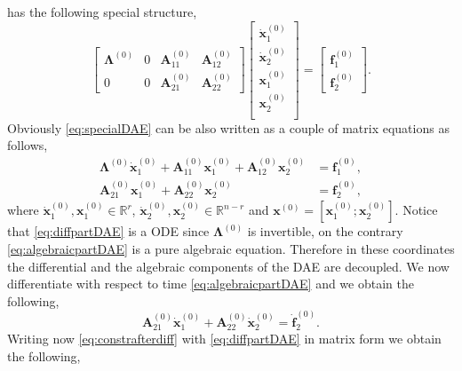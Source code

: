 		has the following special structure, 
		\begin{equation}
			\label{eq:specialDAE}
			\begin{bmatrix}
				\bm{\Lambda}^{(0)}	& 0 & \bm{A}_{11}^{(0)} 	& \bm{A}_{12}^{(0)} \\
				0 					& 0 & \bm{A}_{21}^{(0)}  	& \bm{A}_{22}^{(0)}
			\end{bmatrix}
			\begin{bmatrix}
				\dot{\bm{x}}_{1}^{(0)}\\
				\dot{\bm{x}}_{2}^{(0)}\\
				\bm{x}_{1}^{(0)}\\
				\bm{x}_{2}^{(0)} \\
			\end{bmatrix}
			= 
			\begin{bmatrix}
				\bm{f}_{1}^{(0)}\\
				\bm{f}_{2}^{(0)}
			\end{bmatrix}.
		\end{equation}
		Obviously \cref{eq:specialDAE} can be also written as a couple of matrix equations as follows,
		\begin{subequations}
			\begin{align}
				\label{eq:diffpartDAE}
				\bm{\Lambda}^{(0)}\dot{\bm{x}}_{1}^{(0)} + 
				\bm{A}_{11}^{(0)}\bm{x}_{1}^{(0)} + 
				\bm{A}_{12}^{(0)}\bm{x}_2^{(0)} &= \bm{f}_{1}^{(0)}, \\
				\label{eq:algebraicpartDAE}
				\bm{A}_{21}^{(0)}\bm{x}_{1}^{(0)} + 
				\bm{A}_{22}^{(0)}\bm{x}_{2}^{(0)} &= \bm{f}_{2}^{(0)},
			\end{align}
		\end{subequations}
		where $\dot{\bm{x}}_{1}^{(0)},\bm{x}_{1}^{(0)}\in\mathbb{R}^{r}$, 
		$\dot{\bm{x}}_{2}^{(0)},\bm{x}_{2}^{(0)}\in\mathbb{R}^{n-r}$
		and $\bm{x}^{(0)} = [\bm{x}_{1}^{(0)}; \bm{x}_{2}^{(0)}]$.
		Notice that \cref{eq:diffpartDAE} is a ODE since $\bm{\Lambda}^{(0)}$
		is invertible, on the contrary \cref{eq:algebraicpartDAE}
		is a pure algebraic equation.
		Therefore in these coordinates the differential and the
		algebraic components of the DAE are decoupled.
		We now differentiate with respect to time \cref{eq:algebraicpartDAE}
		and we obtain the following, 
		\begin{equation}
			\label{eq:constrafterdiff}
			\bm{A}_{21}^{(0)}\dot{\bm{x}}_{1}^{(0)} + \bm{A}_{22}^{(0)}\dot{\bm{x}}_{2}^{(0)} = \dot{\bm{f}}_{2}^{(0)}.
		\end{equation} 
		Writing now \cref{eq:constrafterdiff} with \cref{eq:diffpartDAE} in matrix form we obtain the following,
